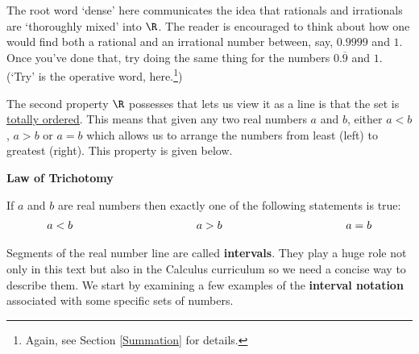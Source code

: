 \medskip

The root word `dense' here communicates the idea that rationals and irrationals are `thoroughly mixed' into $\R$.   The reader is encouraged to think about how one would find both a rational and an irrational number between, say, $0.9999$ and $1$. Once you've done that, try doing the same thing for the numbers $0.\overline{9}$ and $1$. (`Try' is the operative word, here.\footnote{Again, see Section \ref{Summation} for details.})

\smallskip

The second property $\R$ possesses that lets us view it as a line is that the set is \href{http://en.wikipedia.org/wiki/Total_order}{\underline{totally ordered}}. This means that given any two real numbers $a$ and $b$, either $a < b$, $a > b$ or $a = b$ which allows us to arrange the numbers from least (left) to greatest (right). This property is given below.

\medskip

\label{trichotomy}

\colorbox{ResultColor}{\bbm

\centerline{\textbf{Law of Trichotomy}}

If $a$ and $b$ are real numbers then exactly one of the following statements is true: \vspace{-.15in} \[ \begin{array}{lclcl} a < b & \hspace*{1.25in} & a > b & \hspace*{1.25in} & a = b \end{array} \]

\ebm}

\medskip

Segments of the real number line are called \textbf{intervals}.  They play a huge role not only in this text but also in the Calculus curriculum so we need a concise way to describe them.  We start by examining a few examples of the \textbf{interval notation} associated with some specific sets of numbers.  

